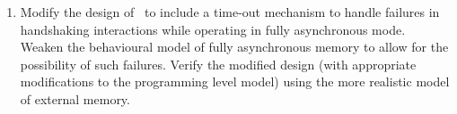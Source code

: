 \begin{enumerate}
\item
Modify the design of \Tamarack\ to include a time-out mechanism
to handle failures in handshaking interactions while operating
in fully asynchronous mode.
Weaken the behavioural model of fully asynchronous
memory to allow for the possibility of such failures.
Verify the modified design (with appropriate modifications to
the programming level model) using the more realistic model of
external memory.

\end{enumerate}
